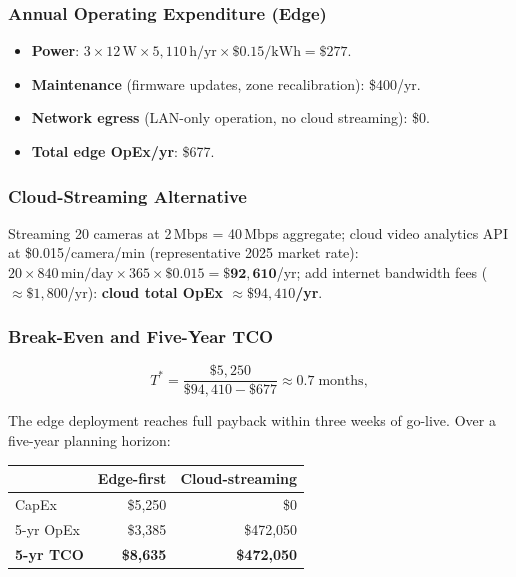 \documentclass[11pt,a4paper]{article}
\begin{document}
\subsubsection*{Annual Operating Expenditure (Edge)}

\begin{itemize}[leftmargin=*, noitemsep]
  \item \textbf{Power}: $3 \times 12\,\mathrm{W} \times 5{,}110\,\mathrm{h/yr}
    \times \$0.15/\mathrm{kWh} = \$277$.
  \item \textbf{Maintenance} (firmware updates, zone recalibration):
    \$400/yr.
  \item \textbf{Network egress} (LAN-only operation, no cloud streaming):
    \$0.
  \item \textbf{Total edge OpEx/yr}: \$677.
\end{itemize}

\subsubsection*{Cloud-Streaming Alternative}

Streaming 20 cameras at 2\,Mbps = 40\,Mbps aggregate; cloud video
analytics API at \$0.015/camera/min (representative 2025 market rate):
$20 \times 840\,\mathrm{min/day} \times 365 \times \$0.015
= \$\mathbf{92{,}610}$/yr; add internet bandwidth fees
($\approx\$1{,}800$/yr): \textbf{cloud total OpEx $\approx \$94{,}410$/yr}.

\subsubsection*{Break-Even and Five-Year TCO}

\begin{equation*}
  T^* = \frac{\$5{,}250}{\$94{,}410 - \$677} \approx \mathbf{0.7\;\mathrm{months}},
\end{equation*}

The edge deployment reaches full payback within three weeks of
go-live. Over a five-year planning horizon:

\begin{center}
\begin{tabular}{lrr}
  \toprule
  & \textbf{Edge-first} & \textbf{Cloud-streaming} \\
  \midrule
  CapEx & \$5,250 & \$0 \\
  5-yr OpEx & \$3,385 & \$472,050 \\
  \textbf{5-yr TCO} & \textbf{\$8,635} & \textbf{\$472,050} \\
  \bottomrule
\end{tabular}
\end{center}
\end{document}
